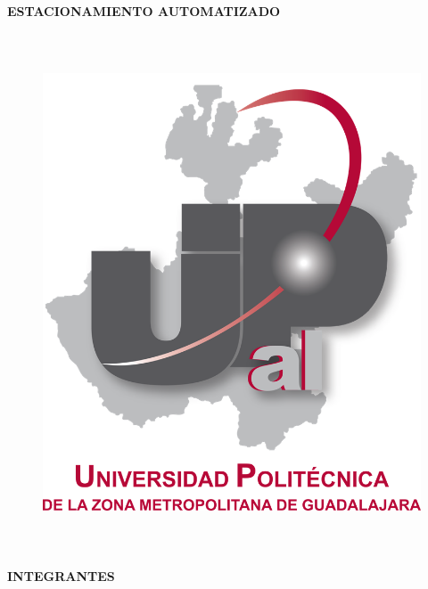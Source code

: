 \documentclass[12pt]{article}
\begin{document}
\begin{Center}
{\fontsize{14pt}{16.8pt}\selectfont \textbf{ESTACIONAMIENTO AUTOMATIZADO }\par}
\end{Center}\par


\vspace{\baselineskip}



\begin{figure}[H]
	\begin{Center}
		\includegraphics[width=5.24in,height=6.06in]{./media/image1.png}
	\end{Center}
\end{figure}



\par

\begin{Center}
{\fontsize{10pt}{12.0pt}\selectfont \textbf{INTEGRANTES}\par}
\end{Center}\par
\end{document}
